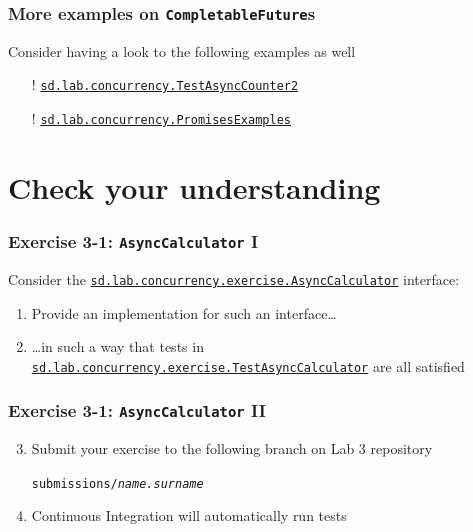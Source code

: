 \documentclass{beamer}\mode<presentation>{\usetheme{AMSCesenaPurpleAndGold}}
\begin{document}
\begin{frame}[c]
\frametitle{More examples on \texttt{CompletableFuture}s}

Consider having a look to the following examples as well
%
\begin{itemize}
	\item[!] \href{https://gitlab.com/pika-lab/courses/ds/aa1920/lab-03/blob/master/src/test/java/sd/lab/concurrency/TestAsyncCounter2.java}{\texttt{sd.lab.concurrency.\alert{TestAsyncCounter2}}}
	\item[!] \href{https://gitlab.com/pika-lab/courses/ds/aa1920/lab-03/blob/master/src/test/java/sd/lab/concurrency/PromisesExamples.java}{\texttt{sd.lab.concurrency.\alert{PromisesExamples}}}
\end{itemize}

\end{frame}

\section{Check your understanding}

\begin{frame}[c]
\frametitle{Exercise 3-1: \texttt{AsyncCalculator} I}

Consider the \href{https://gitlab.com/pika-lab/courses/ds/aa1920/lab-03/blob/master/src/main/java/sd/lab/concurrency/exercise/AsyncCalculator.java}{\texttt{sd.lab.concurrency.exercise.\alert{AsyncCalculator}}} interface:
%
\vfill
%

%
\vfill
%
\begin{enumerate}
	\item Provide an implementation for such an interface\ldots
	
	\vfill
	
	\item \ldots in such a way that tests in \href{https://gitlab.com/pika-lab/courses/ds/aa1920/lab-03/blob/master/src/test/java/sd/lab/concurrency/exercise/TestAsyncCalculator.java}{\texttt{sd.lab\allowbreak{}.concurrency\allowbreak{}.exercise\allowbreak{}.\alert{TestAsyncCalculator}}} are all satisfied
\end{enumerate}

\end{frame}

\begin{frame}[c]
\frametitle{Exercise 3-1: \texttt{AsyncCalculator} II}

\begin{enumerate}\setcounter{enumi}{2}
	\item Submit your exercise to the following branch on Lab 3 repository
	\begin{center}
		\texttt{submissions/\textit{name.surname}}
	\end{center}

	\vfill

	\item Continuous Integration will automatically run tests
\end{enumerate}

\end{frame}
\end{document}
